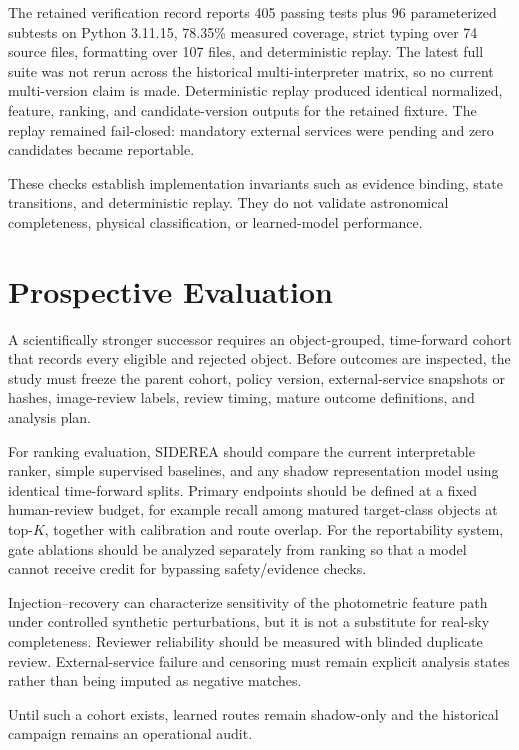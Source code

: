 \documentclass[10pt,conference]{IEEEtran}
\begin{document}
The retained verification record reports 405 passing tests plus 96 parameterized subtests on Python 3.11.15, 78.35\% measured coverage, strict typing over 74 source files, formatting over 107 files, and deterministic replay. The latest full suite was not rerun across the historical multi-interpreter matrix, so no current multi-version claim is made. Deterministic replay produced identical normalized, feature, ranking, and candidate-version outputs for the retained fixture. The replay remained fail-closed: mandatory external services were pending and zero candidates became reportable.

These checks establish implementation invariants such as evidence binding, state transitions, and deterministic replay. They do not validate astronomical completeness, physical classification, or learned-model performance.

\section{Prospective Evaluation}
A scientifically stronger successor requires an object-grouped, time-forward cohort that records every eligible and rejected object. Before outcomes are inspected, the study must freeze the parent cohort, policy version, external-service snapshots or hashes, image-review labels, review timing, mature outcome definitions, and analysis plan.

For ranking evaluation, SIDEREA should compare the current interpretable ranker, simple supervised baselines, and any shadow representation model using identical time-forward splits. Primary endpoints should be defined at a fixed human-review budget, for example recall among matured target-class objects at top-$K$, together with calibration and route overlap. For the reportability system, gate ablations should be analyzed separately from ranking so that a model cannot receive credit for bypassing safety/evidence checks.

Injection--recovery can characterize sensitivity of the photometric feature path under controlled synthetic perturbations, but it is not a substitute for real-sky completeness. Reviewer reliability should be measured with blinded duplicate review. External-service failure and censoring must remain explicit analysis states rather than being imputed as negative matches.

Until such a cohort exists, learned routes remain shadow-only and the historical campaign remains an operational audit.
\end{document}
